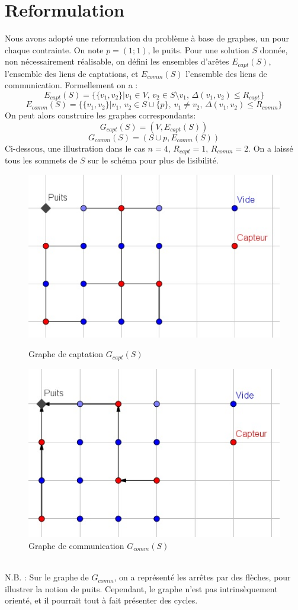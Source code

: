 \documentclass[12pt,a4paper]{article}
\begin{document}
\section{Reformulation}
Nous avons adopté une reformulation du problème à base de graphes, un pour chaque contrainte. On note $p=(1;1)$, le puits. 
Pour une solution $S$ donnée, non nécessairement réalisable, on défini les ensembles d'arêtes $E_{capt}(S)$, l'ensemble des liens de captations, et $E_{comm}(S)$ l'ensemble des liens de communication. Formellement on a :
\[E_{capt}(S)=\{\{v_1,v_2\}|v_1\in V,\,v_2\in S\setminus v_1,\, \Delta(v_1,v_2)\leq R_{capt}\}\] 
\[E_{comm}(S)=\{\{v_1,v_2\}|v_1,\,v_2\in S\cup \{p\},\ v_1\neq v_2,\,\Delta(v_1,v_2)\leq R_{comm}\}\] 
On peut alors construire les graphes correspondants:
\[G_{capt}(S)=(V,E_{capt}(S))\]
\[G_{comm}(S)=(S\cup p,E_{comm}(S))\]
Ci-dessous, une illustration dans le cas $n=4$, $R_{capt}=1$, $R_{comm}=2$. On a laissé tous les sommets de $S$ sur le schéma pour plus de lisibilité.
\begin{figure}[!h]
\center
\includegraphics[scale=1]{Images/4_1_2_captgraph.jpg}
\caption{Graphe de captation $G_{capt}(S)$}
\includegraphics[scale=1]{Images/4_1_2_commgraph.jpg}
\caption{Graphe de communication $G_{comm}(S)$}
\end{figure}
\\N.B. : Sur le graphe de $G_{comm}$, on a représenté les arrêtes par des flèches, pour illustrer la notion de puits. Cependant, le graphe n'est pas intrinsèquement orienté, et il pourrait tout à fait présenter des cycles.
\end{document}
